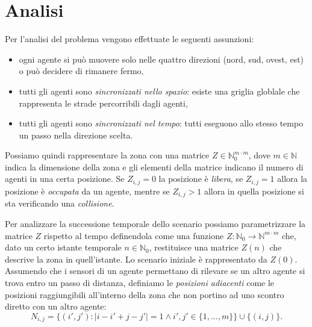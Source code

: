 \section{Analisi}
Per l’analisi del problema vengono effettuate le seguenti assunzioni:
\begin{itemize}
	\item ogni agente si può muovere solo nelle quattro direzioni (nord, sud, ovest, est) o può decidere di rimanere fermo,
	\item tutti gli agenti sono \emph{sincronizzati nello spazio}: esiste una griglia globlale che rappresenta le strade percorribili dagli agenti,
	\item tutti gli agenti sono \emph{sincronizzati nel tempo}: tutti eseguono allo stesso tempo un passo nella direzione scelta.
\end{itemize}

Possiamo quindi rappresentare la zona con una matrice $Z \in \mathbb{N}_0^{m\cdot m}$, dove $m \in \mathbb{N}$ indica la dimensione della zona e gli elementi della matrice indicano il numero di agenti in una certa posizione. Se $Z_{i,j}=0$ la posizione è \emph{libera}, se $Z_{i,j}=1$  allora la posizione è \emph{occupata} da un agente, mentre se $Z_{i,j}>1$ allora in quella posizione si sta verificando una \emph{collisione}.

Per analizzare la successione temporale dello scenario possiamo parametrizzare la matrice $Z$ rispetto al tempo definendola come una funzione $Z:\mathbb{N}_0 \rightarrow \mathbb{N}^{m\cdot m}$ che, dato un certo istante temporale $n \in \mathbb{N}_0$, restituisce una matrice $Z(n)$ che descrive la zona in quell’istante. Lo scenario iniziale è rappresentato da $Z(0)$.
Assumendo che i sensori di un agente permettano di rilevare se un altro agente si trova entro un passo di distanza, definiamo le \emph{posizioni adiacenti} come le posizioni raggiungibili all’interno della zona che non portino ad uno scontro diretto con un altro agente:
$$ N_{i,j} = \{(i',j') : |i-i'+j-j'| = 1 \wedge i',j' \in \{1,\dots,m\}\} \cup \{(i,j)\}.$$

